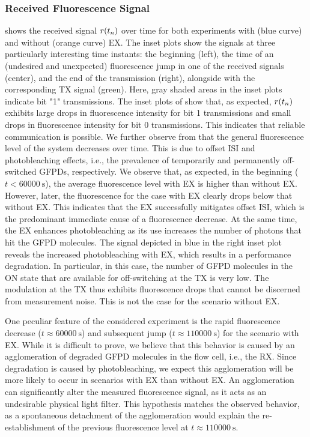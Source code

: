 \subsubsection{Received Fluorescence Signal}\label{sssec:time_signal}
\scaleSubsubsectionBelow
%
 shows the received signal $r(t_n)$ over time for both experiments with (blue curve) and without (orange curve) \ac{EX}. The inset plots show the signals at three particularly interesting time instants: the beginning (left), the time of an (undesired and unexpected) fluorescence jump in one of the received signals (center), and the end of the transmission (right), alongside with the corresponding \ac{TX} signal (green). Here, gray shaded areas in the inset plots indicate bit "1" transmissions. The inset plots of  show that, as expected, $r(t_n)$ exhibits large drops in fluorescence intensity for bit 1 transmissions and small drops in fluorescence intensity for bit 0 transmissions. This indicates that reliable communication is possible. We further observe from  that the general fluorescence level of the system decreases over time. This is due to offset \ac{ISI} and photobleaching effects, i.e., the prevalence of temporarily and permanently off-switched \acp{GFPD}, respectively. We observe that, as expected, in the beginning ($t < \SI{60000}{\s}$), the average fluorescence level with \ac{EX} is higher than without \ac{EX}. However, later, the fluorescence for the case with \ac{EX} clearly drops below that without \ac{EX}. This indicates that the \ac{EX} successfully mitigates offset \ac{ISI}, which is the predominant immediate cause of a fluorescence decrease. At the same time, the \ac{EX} enhances photobleaching as its use increases the number of photons that hit the \ac{GFPD} molecules. The signal depicted in blue in the right inset plot reveals the increased photobleaching with \ac{EX}, which results in a performance degradation. In particular, in this case, the number of \ac{GFPD} molecules in the ON state that are available for off-switching at the \ac{TX} is very low. The modulation at the \ac{TX} thus exhibits fluorescence drops that cannot be discerned from measurement noise. This is not the case for the scenario without \ac{EX}. 

One peculiar feature of the considered experiment is the rapid fluorescence decrease ($t \approx \SI{60000}{\s}$) and subsequent jump ($t \approx \SI{110000}{\s}$) for the scenario with \ac{EX}. While it is difficult to prove, we believe that this behavior is caused by an agglomeration of degraded \ac{GFPD} molecules in the flow cell, i.e., the \ac{RX}. Since degradation is caused by photobleaching, we expect this agglomeration will be more likely to occur in scenarios with \ac{EX} than without \ac{EX}. An agglomeration can significantly alter the measured fluorescence signal, as it acts as an undesirable physical light filter. This hypothesis matches the observed behavior, as a spontaneous detachment of the agglomeration would explain the re-establishment of the previous fluorescence level at $t \approx \SI{110000}{\s}$.
%
\scaleSubsubsection
